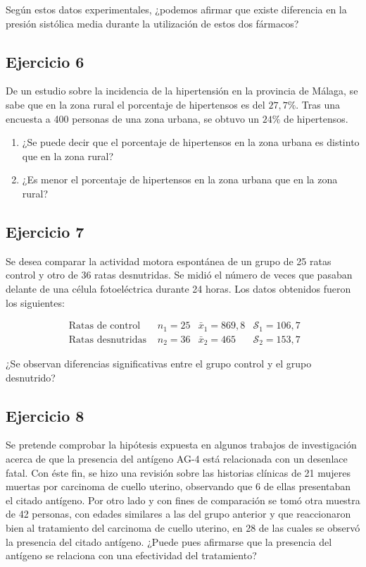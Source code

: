 \documentclass[
]{article}
\providecommand{\tightlist}{%
  \setlength{\itemsep}{0pt}\setlength{\parskip}{0pt}}
\begin{document}
Según estos datos experimentales, ¿podemos afirmar que existe diferencia en la presión sistólica media durante la utilización de estos dos fármacos?

\subsection{Ejercicio 6}\label{ejercicio-6-3}

De un estudio sobre la incidencia de la hipertensión en la provincia de Málaga, se sabe que en la zona rural el porcentaje de hipertensos es del \(27,7 \%\). Tras una encuesta a 400 personas de una zona urbana, se obtuvo un \(24 \%\) de hipertensos.

\begin{enumerate}
\def\labelenumi{\arabic{enumi}.}
\tightlist
\item
  ¿Se puede decir que el porcentaje de hipertensos en la zona urbana es distinto que en la zona rural?
\item
  ¿Es menor el porcentaje de hipertensos en la zona urbana que en la zona rural?
\end{enumerate}

\subsection{Ejercicio 7}\label{ejercicio-7-4}

Se desea comparar la actividad motora espontánea de un grupo de 25 ratas control y otro de 36 ratas desnutridas. Se midió el número de veces que pasaban delante de una célula fotoeléctrica durante 24 horas. Los datos obtenidos fueron los siguientes:

\[
\begin{array}{l|ccc}
\text { Ratas de control } & n_{1}=25 & \bar{x}_{1}=869,8 & \mathcal{S}_{1}=106,7 \\
\hline \text { Ratas desnutridas } & n_{2}=36 & \bar{x}_{2}=465 & \mathcal{S}_{2}=153,7
\end{array}
\]

¿Se observan diferencias significativas entre el grupo control y el grupo desnutrido?

\subsection{Ejercicio 8}\label{ejercicio-8-4}

Se pretende comprobar la hipótesis expuesta en algunos trabajos de investigación acerca de que la presencia del antígeno AG-4 está relacionada con un desenlace fatal. Con éste fin, se hizo una revisión sobre las historias clínicas de 21 mujeres muertas por carcinoma de cuello uterino, observando que 6 de ellas presentaban el citado antígeno. Por otro lado y con fines de comparación se tomó otra muestra de 42 personas, con edades similares a las del grupo anterior y que reaccionaron bien al tratamiento del carcinoma de cuello uterino, en 28 de las cuales se observó la presencia del citado antígeno. ¿Puede pues afirmarse que la presencia del antígeno se relaciona con una efectividad del tratamiento?
\end{document}
